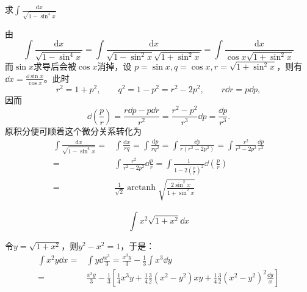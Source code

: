 \begin{example}
求$\displaystyle\int \frac{\mathrm{d}x}{\sqrt{1 - \sin^4 x}}$
\end{example}
\begin{solution}
    由\[\int \frac{\mathrm{d}x}{\sqrt{1 - \sin^4 x}}=\int \frac{\mathrm{d}x}{\sqrt{1 - \sin^2 x}\sqrt{1 + \sin^2 x}}=\int \frac{\mathrm{d}x}{\cos x\sqrt{1+\sin^2 x}}\]
    而$\sin x$求导后会被$\cos x$消掉，设 $p = \sin x, q = \cos x, r = \sqrt{1 + \sin^2 x}$，则有$\dd x=\frac{\dd \sin x}{\cos x}$。此时
    \[
    r^2=1+p^2,\qquad q^2=1-p^2=r^2-2p^2,\qquad r\dd r=p\dd p,
    \]
    因而
    \[
    \dd\left(\frac{p}{r}\right)=\frac{r\dd p-p\dd r}{r^2}=\frac{r^2-p^2}{r^3}\dd p=\frac{\dd p}{r^3}.
    \]
    原积分便可顺着这个微分关系转化为
    \begin{align*}
\int \frac{\mathrm{d}x}{\sqrt{1 - \sin^4 x}} =& \int \frac{\mathrm{d}x}{rq} = \int \frac{\mathrm{d}p}{rq^2}=\int\frac{\dd p}{r(r^2-2p^2)}=\int\frac{r^2}{r^2-2p^2}\frac{\dd p}{r^3}\\
=&\int\frac{r^2}{r^2-2p^2}\dd\frac{p}{r}=\int\frac{1}{1-2\left(\frac{p}{r}\right)^2}\dd\left(\frac{p}{r}\right)\\
=&\frac{1}{\sqrt{2}} \operatorname{arctanh} \sqrt{\frac{2 \sin^2 x}{1 + \sin^2 x}}
    \end{align*}
\end{solution}

\begin{example}
    \[\int x^2\sqrt{1+x^2}\dd x\]
\end{example}
\begin{solution}
    令$y=\sqrt{1+x^2}$，则$y^2-x^2=1$，于是：
    \begin{align*}
        \int x^2y\dd x=& \int y\dd \frac{x^3}3=\frac{x^3y}3-\frac13\int x^3\dd y\\
        =&\frac{x^3y}{3}-\frac13\left[\frac14 x^3y+\frac14\frac32(x^2-y^2)xy+\frac14\frac32(x^2-y^2)^2\frac{\dd y}{x}\right]
    \end{align*}
\end{solution}

